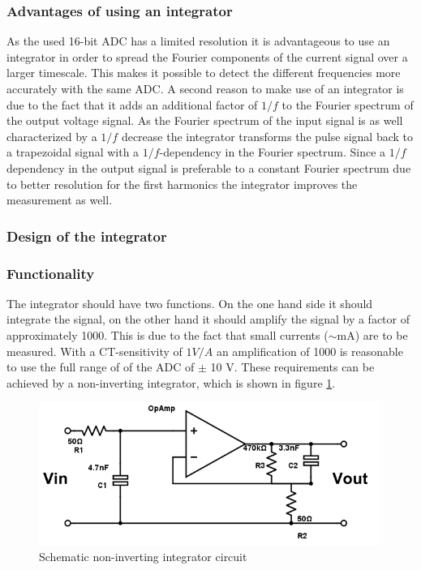 \subsubsection{Advantages of using an integrator}
As the used 16-bit ADC has a limited resolution it is advantageous to use an integrator in order to spread the Fourier components of the current signal over a larger timescale. This makes it possible to detect the different frequencies more accurately with the same ADC. 
A second reason to make use of an integrator is due to the fact that it adds an additional factor of $1/f$ to the Fourier spectrum of the output voltage signal. As the Fourier spectrum of the input signal is as well characterized by a $1/f$ decrease the integrator transforms the pulse signal back to a trapezoidal signal with a $1/f$-dependency in the Fourier spectrum. Since a $1/f$ dependency in the output signal is preferable to a constant Fourier spectrum due to better resolution for the first harmonics the integrator improves the measurement as well. 

\subsubsection{Design of the integrator}
\subsubsection{Functionality}
The integrator should have two functions. On the one hand side it should integrate the signal, on the other hand it should amplify the signal by a factor of approximately 1000. This is due to the fact that small currents ($\sim$mA) are to be measured. With a CT-sensitivity of $1V/A$ an amplification of 1000 is reasonable to use the full range of of the ADC of $\pm$ 10 V. \footnotemark These requirements can be achieved by a non-inverting integrator, which is shown in figure  \ref{fig.circuit}. 
\begin{figure}[H]
\includegraphics[width=0.99\textwidth]{figures/Method/integrator/circuit.png}
    \caption{Schematic non-inverting integrator circuit}
    \label{fig.circuit}
\end{figure}	

